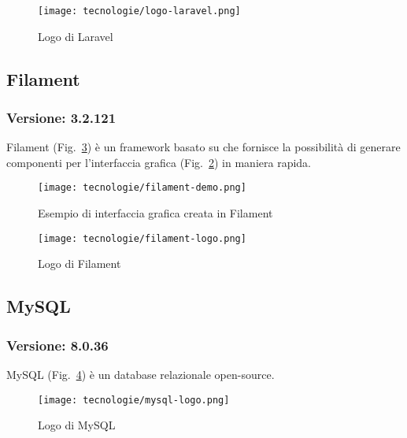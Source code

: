 \begin{figure}[!h] 
  \centering 
  \texttt{[image: tecnologie/logo-laravel.png]} 
  \caption{Logo di Laravel}
  \label{fig:logo-laravel}
\end{figure}

\newpage 

\subsection{\label{tec:Filament}Filament}
\subsubsection{Versione: 3.2.121}
Filament (Fig.~\ref{fig:logo-filament}) è un framework basato su  che fornisce la possibilità di generare componenti per l'interfaccia grafica (Fig.~\ref{fig:gui-filament}) in maniera rapida.

\begin{figure}[!h] 
  \centering 
  \texttt{[image: tecnologie/filament-demo.png]} 
  \caption{Esempio di interfaccia grafica creata in Filament}
  \label{fig:gui-filament}
\end{figure}

\begin{figure}[!h] 
  \centering 
  \texttt{[image: tecnologie/filament-logo.png]} 
  \caption{Logo di Filament}
  \label{fig:logo-filament}
\end{figure}

\newpage

\subsection{\label{tec:mysql}MySQL}
\subsubsection{Versione: 8.0.36}
MySQL (Fig.~\ref{fig:logo-mysql}) è un database relazionale open-source.

\begin{figure}[!h] 
  \centering 
  \texttt{[image: tecnologie/mysql-logo.png]} 
  \caption{Logo di MySQL}
  \label{fig:logo-mysql}
\end{figure}


